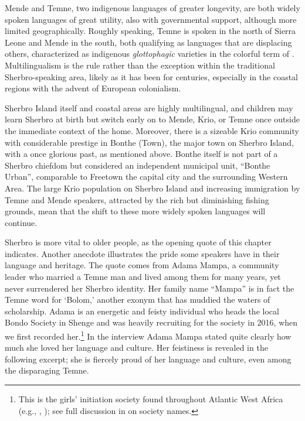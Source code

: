 Mende and Temne, two indigenous languages of greater longevity, are both widely spoken languages of great utility, also with governmental support, although more limited geographically. Roughly speaking, Temne is spoken in the north of Sierra Leone and Mende in the south, both qualifying as languages that are displacing others, characterized as indigenous \textit{glottophagic} varieties in the colorful term of \citet{Calvet1974}. Multilingualism is the rule rather than the exception within the traditional Sherbro-speaking area, likely as it has been for centuries, especially in the coastal regions with the advent of European colonialism.

Sherbro Island itself and coastal areas are highly multilingual, and children may learn Sherbro at birth but switch early on to Mende, Krio, or Temne once outside the immediate context of the home. Moreover, there is a sizeable Krio community with considerable prestige in Bonthe (Town), the major town on Sherbro Island, with a once glorious past, as mentioned above. Bonthe itself is not part of a Sherbro chiefdom but considered an independent municipal unit, “Bonthe Urban”, comparable to Freetown the capital city and the surrounding Western Area. The large Krio population on Sherbro Island and increasing immigration by Temne and Mende speakers, attracted by the rich but diminishing fishing grounds, mean that the shift to these more widely spoken languages will continue.

Sherbro is more vital to older people, as the opening quote of this chapter indicates. Another anecdote illustrates the pride some speakers have in their language and heritage. The quote comes from Adama Mampa, a community leader who married a Temne man and lived among them for many years, yet never surrendered her Sherbro identity. Her family name “Mampa” is in fact the Temne word for ‘Bolom,' another exonym that has muddied the waters of scholarship. Adama is an energetic and feisty individual who heads the local Bondo Society in Shenge and was heavily recruiting for the society in 2016, when we first recorded her.\footnote{This is the girls' initiation society found throughout Atlantic West Africa (e.g., \citealt{Hoffer1975}, \citealt{MacCormack1982}); see full discussion in  on society names.} In the interview Adama Mampa stated quite clearly how much she loved her language and culture. Her feistiness is revealed in the following excerpt; she is fiercely proud of her language and culture, even among the disparaging Temne.

